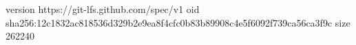 version https://git-lfs.github.com/spec/v1
oid sha256:12c1832ac818536d329b2e9ea8f4cfc0b83b89908c4e5f6092f739ca56ca3f9c
size 262240
